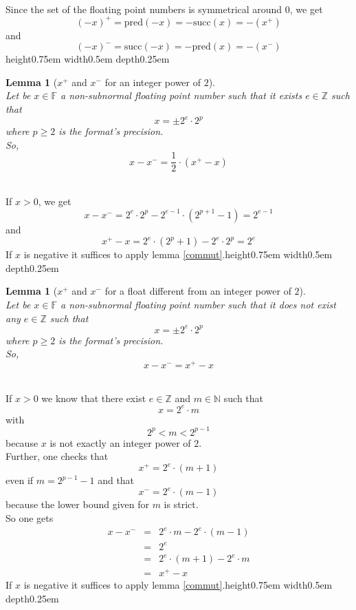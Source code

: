 \documentclass[a4paper,10pt,twoside]{article}
\newtheorem{lemma}[theorem]{Lemma}
\newenvironment{proof}[1][Proof]{\begin{trivlist}
\item[\hskip \labelsep {\bfseries #1}]}{\end{trivlist}}
\newcommand{\qed}{\nobreak \ifvmode \relax \else \ifdim \lastskip<1.5em \hskip-\lastskip
\hskip1.5em plus0em minus0.5em \fi \nobreak \vrule height0.75em width0.5em depth0.25em\fi}
\newcommand{\N}{\ensuremath{\mathbb {N}}}
\newcommand{\Z}{\ensuremath{\mathbb {Z}}}
\newcommand{\F}{\ensuremath{\mathbb {F}}}
\renewcommand{\succ}{\ensuremath{\mathrm{succ}}}
\newcommand{\pred}{\ensuremath{\mathrm{pred}}}
\begin{document}
\begin{proof} ~ \\
Since the set of the floating point numbers is symmetrical around $0$, we get
$$\left( -x\right)^+ = \pred\left( -x \right) = -\succ\left( x \right) = - \left(x^+\right)$$
and
$$\left( -x\right)^- = \succ\left( -x \right) = -\pred\left( x \right) = - \left(x^-\right)$$\qed
\end{proof}
\begin{lemma}[$x^+$ and $x^-$ for an integer power of $2$] \label{poweroftwo} ~ \\
Let be $x \in \F$ a non-subnormal floating point number such that it exists $e \in \Z$ such that
$$x=\pm2^e \cdot 2^p$$
where $p \geq 2$ is the format's precision.\\
So,
$$x - x^-= \frac{1}{2} \cdot \left( x^+ - x \right)$$
\end{lemma}
\begin{proof} ~\\
If $x > 0$, we get
$$x - x^- = 2^e \cdot 2^p - 2^{e-1} \cdot \left( 2^{p+1} - 1 \right) = 2^{e-1}$$
and
$$x^+ - x = 2^e \cdot \left( 2^p + 1 \right) - 2^e \cdot 2^p = 2^e$$
If $x$ is negative it suffices to apply lemma \ref{commut}.\qed
\end{proof}
\begin{lemma}[$x^+$ and $x^-$ for a float different from an integer power of $2$] \label{notpoweroftwo} ~\\
Let be $x \in \F$ a non-subnormal floating point number such that it does not exist any $e \in \Z$ 
such that $$x=\pm2^e \cdot 2^p$$
where $p \geq 2$ is the format's precision.\\
So,
$$x - x^- = x^+ - x$$
\end{lemma}
\begin{proof} ~ \\
If $x > 0$ we know that there exist $e \in \Z$ and $m \in \N$ such that
$$x = 2^e \cdot m$$
with
$$2^p < m < 2^{p-1}$$
because $x$ is not exactly an integer power of $2$. \\
Further, one checks that 
$$x^+ = 2^e \cdot \left( m + 1 \right)$$
even if $m = 2^{p-1} -1$ and that 
$$x^- = 2^e \cdot \left( m - 1 \right)$$
because the lower bound given for $m$ is strict. \\
So one gets
\begin{eqnarray*}
x - x^- & = & 
2^e \cdot m - 2^e \cdot \left(m - 1 \right) \\
& = & 2^e \\
& = & 2^e \cdot \left( m + 1 \right) - 2^e \cdot m \\
& = & x^+ - x
\end{eqnarray*}
If $x$ is negative it suffices to apply lemma \ref{commut}.\qed
\end{proof}
\end{document}

